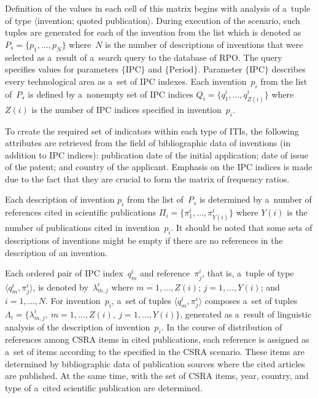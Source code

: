 \begin{multicols}{2}
    Definition of the values in each cell of this matrix begins with analysis of a~tuple 
of type $\langle$invention; quoted publication$\rangle$. During execution of the 
scenario, such tuples are generated for each of the invention from the list which is 
denoted as $P_s = \{p_1, \ldots , p_N\}$ where~$N$ is the number of descriptions of 
inventions that were selected as a~result of a~search query to the database of RPO. 
The query specifies values for parameters $\{\mathrm{IPC}\}$ and 
$\{\mathrm{Period}\}$. Parameter $\{\mathrm{IPC}\}$ describes every 
technological area as a~set of IPC indexes. Each invention~$p_i$ from the list 
of~$P_s$ is defined by a~nonempty set of IPC indices $Q_i=\{ q_1^i, \ldots , 
q^i_{Z(i)}\}$ where~$Z(i)$ is the number of IPC indices specified in 
invention~$p_i$.
    
    To create the required set of indicators within each type of ITIs, the following 
attributes are retrieved from the field of bibliographic data of inventions (in addition 
to IPC indices): publication date of the initial application;
 date of issue of the patent; and 
country of the applicant. Emphasis on the IPC indices is made due to the fact that 
they are crucial to form the matrix of frequency ratios.
    
    Each description of invention $p_i$ from the list of~$P_s$ is determined by 
a~number of references cited in scientific publications $\Pi_i=\{\pi_1^i,\ldots , 
\pi^i_{Y(i)}\}$ where $Y(i)$ is the number of publications cited in invention~$p_i$. 
It should be noted that some sets of descriptions of inventions might be empty if there 
are no references in the description of an invention.
    
    Each ordered pair of IPC index~$q_m^i$ and reference~$\pi^i_j$, that is, 
a~tuple of type $\langle q_m^i, \pi^i_j\rangle$, is denoted by~$\lambda^i_{m,j}$ 
where $m = 1, \ldots  , Z(i)$; 
$j = 1, \ldots  , Y(i)$; and $i = 1, \ldots , N$. For invention~$p_i$, a~set of tuples $\langle 
q_m^i, \pi_j^i\rangle$ composes a~set of tuples 
$\Lambda_i=\{\lambda^i_{m,j},\ m=1, \ldots  , Z(i),\ j=1, \ldots , Y(i)\}$, generated as a~result of linguistic analysis of the 
description of invention~$p_i$. In the course of distribution of references among 
CSRA items in cited publications, each reference is assigned as a~set of items according 
to the specified in the  CSRA scenario. These items are determined by bibliographic 
data of publication sources where the cited articles are published. At the same time, 
with the set of CSRA items, year, country, and type of a~cited scientific publication 
are determined.


\end{multicols}
